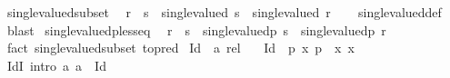 \begin{isabellebody}
\isanewline
{}\isamarkupfalse%
\ single{\isacharunderscore}{\kern0pt}valued{\isacharunderscore}{\kern0pt}subset{\isacharcolon}{\kern0pt}\isanewline
\ \ {\isachardoublequoteopen}r\ {\isasymsubseteq}\ s\ {\isasymLongrightarrow}\ single{\isacharunderscore}{\kern0pt}valued\ s\ {\isasymLongrightarrow}\ single{\isacharunderscore}{\kern0pt}valued\ r{\isachardoublequoteclose}\isanewline
%
\isadelimproof
\ \ %
\endisadelimproof
%
\isatagproof
{}\isamarkupfalse%
\ single{\isacharunderscore}{\kern0pt}valued{\isacharunderscore}{\kern0pt}def\ \isamarkupfalse%
\ blast%
\endisatagproof
{\isafoldproof}%
%
\isadelimproof
\isanewline
%
\endisadelimproof
\isanewline
{}\isamarkupfalse%
\ single{\isacharunderscore}{\kern0pt}valuedp{\isacharunderscore}{\kern0pt}less{\isacharunderscore}{\kern0pt}eq{\isacharcolon}{\kern0pt}\isanewline
\ \ {\isachardoublequoteopen}r\ {\isasymle}\ s\ {\isasymLongrightarrow}\ single{\isacharunderscore}{\kern0pt}valuedp\ s\ {\isasymLongrightarrow}\ single{\isacharunderscore}{\kern0pt}valuedp\ r{\isachardoublequoteclose}\isanewline
%
\isadelimproof
\ \ %
\endisadelimproof
%
\isatagproof
{}\isamarkupfalse%
\ {\isacharparenleft}{\kern0pt}fact\ single{\isacharunderscore}{\kern0pt}valued{\isacharunderscore}{\kern0pt}subset\ {\isacharbrackleft}{\kern0pt}to{\isacharunderscore}{\kern0pt}pred{\isacharbrackright}{\kern0pt}{\isacharparenright}{\kern0pt}%
\endisatagproof
{\isafoldproof}%
%
\isadelimproof
%
\endisadelimproof
%
\isadelimdocument
%
\endisadelimdocument
%
\isatagdocument
%
\isamarkuptrue%
%
\isamarkuptrue%
%
\endisatagdocument
{\isafolddocument}%
%
\isadelimdocument
%
\endisadelimdocument
{}\isamarkupfalse%
\ Id\ {\isacharcolon}{\kern0pt}{\isacharcolon}{\kern0pt}\ {\isachardoublequoteopen}{\isacharprime}{\kern0pt}a\ rel{\isachardoublequoteclose}\isanewline
\ \ \ {\isachardoublequoteopen}Id\ {\isacharequal}{\kern0pt}\ {\isacharbraceleft}{\kern0pt}p{\isachardot}{\kern0pt}\ {\isasymexists}x{\isachardot}{\kern0pt}\ p\ {\isacharequal}{\kern0pt}\ {\isacharparenleft}{\kern0pt}x{\isacharcomma}{\kern0pt}\ x{\isacharparenright}{\kern0pt}{\isacharbraceright}{\kern0pt}{\isachardoublequoteclose}\isanewline
\isanewline
{}\isamarkupfalse%
\ IdI\ {\isacharbrackleft}{\kern0pt}intro{\isacharbrackright}{\kern0pt}{\isacharcolon}{\kern0pt}\ {\isachardoublequoteopen}{\isacharparenleft}{\kern0pt}a{\isacharcomma}{\kern0pt}\ a{\isacharparenright}{\kern0pt}\ {\isasymin}\ Id{\isachardoublequoteclose}\isanewline

\end{isabellebody}
